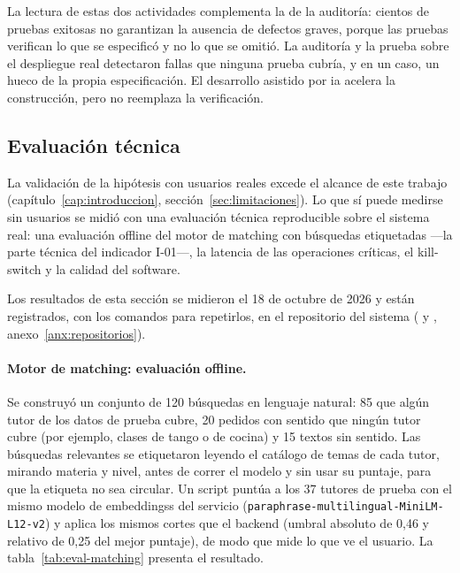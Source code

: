 La lectura de estas dos actividades complementa la de la auditoría:
cientos de pruebas exitosas no garantizan la ausencia de defectos
graves, porque las pruebas verifican lo que se especificó y no lo que se
omitió. La auditoría y la prueba sobre el despliegue real
detectaron fallas que ninguna prueba cubría, y en un caso, un hueco de
la propia especificación. El desarrollo asistido por \gls{ia} acelera la
construcción, pero no reemplaza la verificación.

\subsection{Evaluación técnica}\label{sec:evaluacion-tecnica}

La validación de la hipótesis con usuarios reales excede el alcance de
este trabajo (capítulo~\ref{cap:introduccion},
sección~\ref{sec:limitaciones}). Lo que sí puede medirse sin usuarios
se midió con una evaluación técnica reproducible sobre el sistema real:
una evaluación offline del motor de \gls{matching} con búsquedas
etiquetadas ---la parte técnica del indicador I-01---, la latencia de
las operaciones críticas, el kill-switch y la calidad del software.

Los resultados de esta sección se midieron el 18 de octubre de 2026 y
están registrados, con los comandos para repetirlos, en el repositorio
del sistema ( y
,
anexo~\ref{anx:repositorios}).

\paragraph{Motor de \gls{matching}: evaluación offline.} Se construyó un
conjunto de 120 búsquedas en lenguaje natural: 85 que algún tutor de los
datos de prueba cubre, 20 pedidos con sentido que ningún tutor cubre
(por ejemplo, clases de tango o de cocina) y 15 textos sin sentido. Las
búsquedas relevantes se etiquetaron leyendo el catálogo de temas de cada
tutor, mirando materia y nivel, antes de correr el modelo y sin usar su
puntaje, para que la etiqueta no sea circular. Un script puntúa a los 37
tutores de prueba con el mismo modelo de \glspl{embeddings} del servicio
(\texttt{paraphrase-multilingual-MiniLM-L12-v2}) y aplica los mismos
cortes que el backend (umbral absoluto de 0,46 y relativo de 0,25 del
mejor puntaje), de modo que mide lo que ve el usuario. La
tabla~\ref{tab:eval-matching} presenta el resultado.

